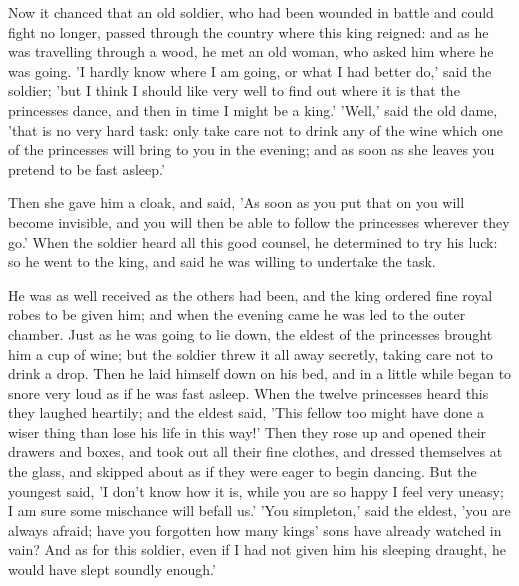 \documentclass[12pt]{book}
\begin{document}
Now it chanced that an old soldier, who had been wounded in battle and
could fight no longer, passed through the country where this king
reigned: and as he was travelling through a wood, he met an old woman,
who asked him where he was going. 'I hardly know where I am going, or
what I had better do,' said the soldier; 'but I think I should like
very well to find out where it is that the princesses dance, and then
in time I might be a king.' 'Well,' said the old dame, 'that is no
very hard task: only take care not to drink any of the wine which one
of the princesses will bring to you in the evening; and as soon as she
leaves you pretend to be fast asleep.'

Then she gave him a cloak, and said, 'As soon as you put that on you
will become invisible, and you will then be able to follow the
princesses wherever they go.' When the soldier heard all this good
counsel, he determined to try his luck: so he went to the king, and
said he was willing to undertake the task.

He was as well received as the others had been, and the king ordered
fine royal robes to be given him; and when the evening came he was led
to the outer chamber. Just as he was going to lie down, the eldest of
the princesses brought him a cup of wine; but the soldier threw it all
away secretly, taking care not to drink a drop. Then he laid himself
down on his bed, and in a little while began to snore very loud as if
he was fast asleep. When the twelve princesses heard this they laughed
heartily; and the eldest said, 'This fellow too might have done a
wiser thing than lose his life in this way!' Then they rose up and
opened their drawers and boxes, and took out all their fine clothes,
and dressed themselves at the glass, and skipped about as if they were
eager to begin dancing. But the youngest said, 'I don't know how it
is, while you are so happy I feel very uneasy; I am sure some
mischance will befall us.' 'You simpleton,' said the eldest, 'you are
always afraid; have you forgotten how many kings' sons have already
watched in vain? And as for this soldier, even if I had not given him
his sleeping draught, he would have slept soundly enough.'
\end{document}
